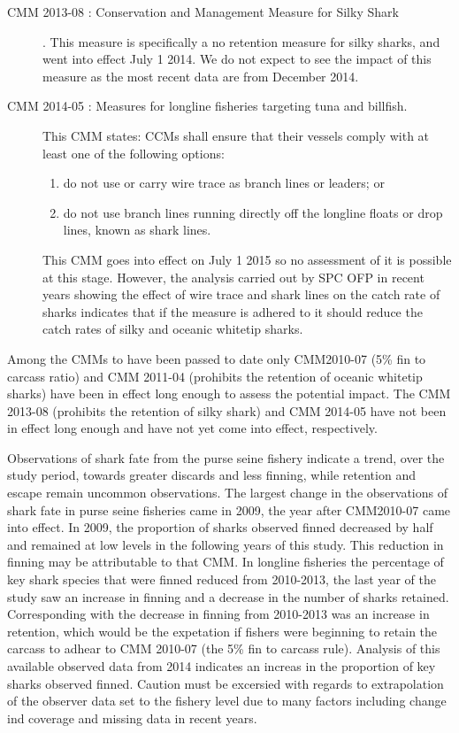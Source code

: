 \documentclass[12pt]{SCreport}
\begin{document}
\begin{description}
\item[CMM 2013-08 : Conservation and Management Measure for Silky Shark]. This measure is specifically a no retention measure for silky sharks, and went into effect July 1 2014. We do not expect to see the impact of this measure as the most recent data are from December 2014. 

\item[CMM 2014-05 : Measures for longline fisheries targeting tuna and billfish.] This CMM  states: 
      CCMs shall ensure that their vessels comply with at least one of the following options:
        \begin{enumerate}
            \item  do not use or carry wire trace as branch lines or leaders; or
            \item  do not use branch lines running directly off the longline floats or drop lines, known as shark lines. 
           \end{enumerate}
This CMM goes into effect on July 1 2015 so no assessment of it is possible at this stage. However, the analysis carried out by SPC OFP \citep{Rice2012_a, Bromhead2013_a, Caneco2014_a} in recent years showing the effect of wire trace and shark lines on the catch rate of sharks indicates that if the measure is adhered to it should reduce the catch rates of silky and oceanic whitetip sharks.

 \end{description}
Among the CMMs to have been passed to date only  CMM2010-07 (5\% fin to carcass ratio) and   CMM 2011-04 (prohibits the retention of oceanic whitetip sharks) have been in effect long enough to assess the potential impact.  The CMM 2013-08 (prohibits the retention of silky shark)  and CMM 2014-05 have not been in effect long enough and  have not yet come into effect, respectively.   

Observations of shark fate from the  purse seine fishery indicate   a trend, over the study period, towards  greater discards and less finning, while retention and escape remain  uncommon observations.  The largest change in the observations of shark fate in purse seine fisheries came in 2009, the year after  CMM2010-07 came into effect.  
In 2009, the proportion of sharks observed finned decreased by half and remained at low levels in the following years of this study.  This reduction in finning may be attributable to that CMM.   In longline fisheries the percentage of key shark species that were finned reduced from 2010-2013, the last year of the study saw an increase in finning and a decrease in the number of sharks retained.  Corresponding with the decrease in finning from 2010-2013 was an increase in retention, which would be the expetation if fishers were beginning to retain the carcass to adhear to CMM 2010-07 (the 5\% fin to carcass rule).      Analysis of this available observed data from 2014 indicates an increas in the proportion of key sharks observed finned.   Caution must be excersied with regards to extrapolation of the observer data set to the fishery level due to many factors including change ind coverage and missing data in recent years. 
\end{document}
